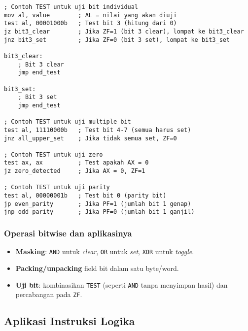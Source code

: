 \documentclass[../main.tex]{subfiles}
\begin{document}
\begin{lstlisting}[language={[x86masm]Assembler}, caption=Instruksi TEST, label={lst:test-examples}]
; Contoh TEST untuk uji bit individual
mov al, value        ; AL = nilai yang akan diuji
test al, 00001000b   ; Test bit 3 (hitung dari 0)
jz bit3_clear        ; Jika ZF=1 (bit 3 clear), lompat ke bit3_clear
jnz bit3_set         ; Jika ZF=0 (bit 3 set), lompat ke bit3_set

bit3_clear:
    ; Bit 3 clear
    jmp end_test

bit3_set:
    ; Bit 3 set
    jmp end_test

; Contoh TEST untuk uji multiple bit
test al, 11110000b   ; Test bit 4-7 (semua harus set)
jnz all_upper_set    ; Jika tidak semua set, ZF=0

; Contoh TEST untuk uji zero
test ax, ax          ; Test apakah AX = 0
jz zero_detected     ; Jika AX = 0, ZF=1

; Contoh TEST untuk uji parity
test al, 00000001b   ; Test bit 0 (parity bit)
jp even_parity       ; Jika PF=1 (jumlah bit 1 genap)
jnp odd_parity       ; Jika PF=0 (jumlah bit 1 ganjil)
\end{lstlisting}

            \subsubsection{Operasi bitwise dan aplikasinya}
\begin{itemize}
    \item \textbf{Masking}: \texttt{AND} untuk \textit{clear}, \texttt{OR} untuk \textit{set}, \texttt{XOR} untuk \textit{toggle}.
    \item \textbf{Packing/unpacking} field bit dalam satu byte/word.
    \item \textbf{Uji bit}: kombinasikan \texttt{TEST} (seperti \texttt{AND} tanpa menyimpan hasil) dan percabangan pada \texttt{ZF}.
\end{itemize}

        \subsection{Aplikasi Instruksi Logika}
\end{document}
